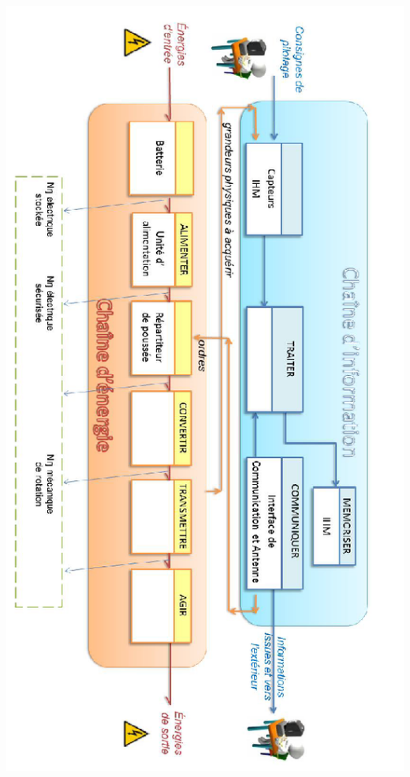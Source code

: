 \documentclass[11pt,oneside]{article}
\begin{document}
{\begin{center}
\includegraphics[height=\textheight]{png/fig_15}
\end{center}
}
\end{document}
